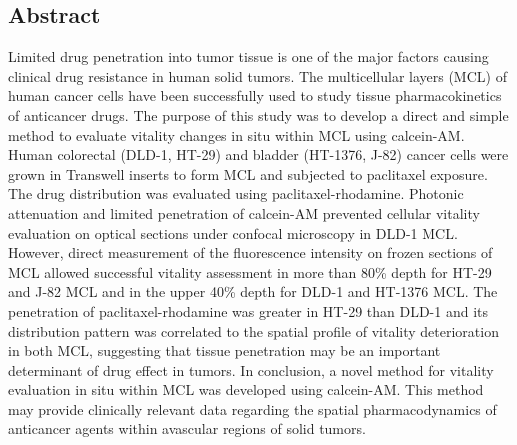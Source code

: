 \documentclass[11pt,a4paper]{article}
\begin{document}
\subsection*{Abstract}
Limited drug penetration into tumor tissue is one of the major factors causing clinical drug resistance in human solid tumors. The multicellular layers (MCL) of human cancer cells have been successfully used to study tissue pharmacokinetics of anticancer drugs. The purpose of this study was to develop a direct and simple method to evaluate vitality changes in situ within MCL using calcein-AM. Human colorectal (DLD-1, HT-29) and bladder (HT-1376, J-82) cancer cells were grown in Transwell inserts to form MCL and subjected to paclitaxel exposure. The drug distribution was evaluated using paclitaxel-rhodamine. Photonic attenuation and limited penetration of calcein-AM prevented cellular vitality evaluation on optical sections under confocal microscopy in DLD-1 MCL. However, direct measurement of the fluorescence intensity on frozen sections of MCL allowed successful vitality assessment in more than 80\% depth for HT-29 and J-82 MCL and in the upper 40\% depth for DLD-1 and HT-1376 MCL. The penetration of paclitaxel-rhodamine was greater in HT-29 than DLD-1 and its distribution pattern was correlated to the spatial profile of vitality deterioration in both MCL, suggesting that tissue penetration may be an important determinant of drug effect in tumors. In conclusion, a novel method for vitality evaluation in situ within MCL was developed using calcein-AM. This method may provide clinically relevant data regarding the spatial pharmacodynamics of anticancer agents within avascular regions of solid tumors. 
\end{document}
